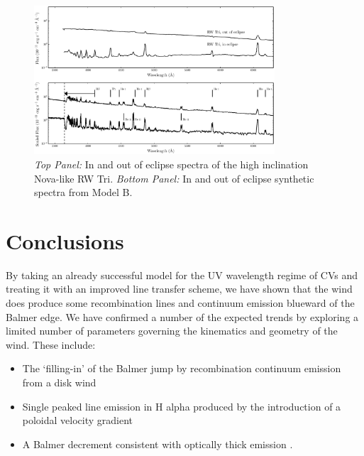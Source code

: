 \documentclass[preprint, a4paper, 11pt]{aastex}
\begin{document}
\begin{figure} %
\includegraphics[width=0.8\textwidth]{figures/fig13_eclipse.eps}
\caption{{\sl Top Panel:} In and out of eclipse spectra of the high
inclination Nova-like RW Tri. {\sl Bottom Panel:} In and out of eclipse synthetic
spectra from Model B.}
\label{rwtricomp}
\end{figure} %








%
%


\section{Conclusions}

By taking an already successful model
for the UV wavelength regime of CVs and treating 
it with an improved line transfer scheme, we have shown
that the wind does produce some recombination lines
and continuum emission blueward of the Balmer edge.
We have confirmed a number of the expected trends
by exploring a limited number of parameters governing the
kinematics and geometry of the wind. These include:

\renewcommand{\labelitemi}{$\bullet$}
\begin{itemize}
	\item The `filling-in' of the Balmer jump \citep{elitzur1983} by recombination 
	continuum emission from a disk wind
	\item Single peaked line emission in H alpha produced by 
	the introduction of a poloidal velocity gradient \citep{MC96}
	\item A Balmer decrement consistent with optically thick emission \citep{elitzur1983}.
\end{itemize}
\smallskip
\end{document}
